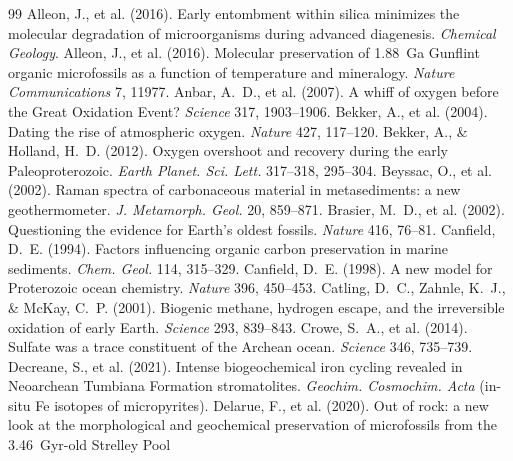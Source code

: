 \documentclass[11pt]{article}
\begin{document}

\begin{thebibliography}{99}\footnotesize\linespread{0.92}\selectfont\setlength{\itemsep}{0pt}\setlength{\parskip}{0pt}
 Alleon, J., et al. (2016). Early entombment within
silica minimizes the molecular degradation of microorganisms during advanced diagenesis.
\textit{Chemical Geology}.
 Alleon, J., et al. (2016). Molecular preservation of
1.88~Ga Gunflint organic microfossils as a function of temperature and mineralogy. \textit{Nature
Communications} 7, 11977.
 Anbar, A.~D., et al. (2007). A whiff of oxygen before the
Great Oxidation Event? \textit{Science} 317, 1903--1906.
 Bekker, A., et al. (2004). Dating the rise of atmospheric
oxygen. \textit{Nature} 427, 117--120.
 Bekker, A., \& Holland, H.~D. (2012). Oxygen overshoot
and recovery during the early Paleoproterozoic. \textit{Earth Planet. Sci. Lett.} 317--318, 295--304.
 Beyssac, O., et al. (2002). Raman spectra of
carbonaceous material in metasediments: a new geothermometer. \textit{J. Metamorph. Geol.} 20,
859--871.
 Brasier, M.~D., et al. (2002). Questioning the evidence
for Earth's oldest fossils. \textit{Nature} 416, 76--81.
 Canfield, D.~E. (1994). Factors influencing organic carbon
preservation in marine sediments. \textit{Chem. Geol.} 114, 315--329.
 Canfield, D.~E. (1998). A new model for Proterozoic ocean
chemistry. \textit{Nature} 396, 450--453.
 Catling, D.~C., Zahnle, K.~J., \& McKay, C.~P. (2001).
Biogenic methane, hydrogen escape, and the irreversible oxidation of early Earth. \textit{Science}
293, 839--843.
 Crowe, S.~A., et al. (2014). Sulfate was a trace constituent
of the Archean ocean. \textit{Science} 346, 735--739.
 Decreane, S., et al. (2021). Intense biogeochemical
iron cycling revealed in Neoarchean Tumbiana Formation stromatolites. \textit{Geochim. Cosmochim.
Acta} (in-situ Fe isotopes of micropyrites).
 Delarue, F., et al. (2020). Out of rock: a new look at
the morphological and geochemical preservation of microfossils from the 3.46~Gyr-old Strelley Pool

\end{thebibliography}
\end{document}
